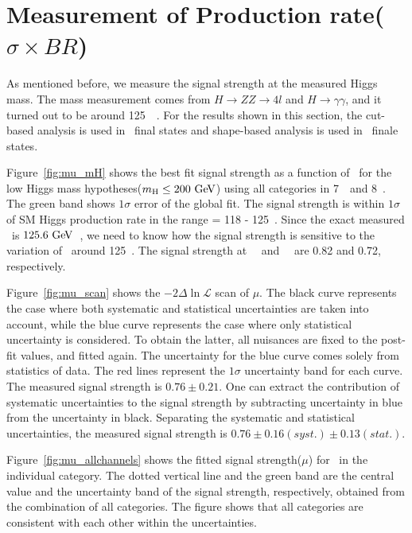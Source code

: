 \section{Measurement of Production rate($\sigma \times BR$)}

As mentioned before, we measure the signal strength at the 
measured Higgs mass. The mass measurement comes from 
$H\rightarrow ZZ\rightarrow4l$ and $H\rightarrow \gamma\gamma$, 
and it turned out to be around 125~\GeV~\cite{Chatrchyan:1637951, CMS-PAS-HIG-13-001}. 
For the results shown in this section,   
the cut-based analysis is used in \SF\ final states 
and shape-based analysis is used in \DF\ finale states. 

Figure~\ref{fig:mu_mH} shows the best fit signal strength 
as a function of \mHi\ for the low Higgs mass hypotheses($m_{\mathrm{H}}\le200~\mathrm{Ge\kern -0.1em V}$)
using all categories in 7~\TeV\ and 8~\TeV. 
The green band shows $1\sigma$ error of the global fit. 
The signal strength is within $1\sigma$ of SM Higgs production rate 
in the range \mHi = 118 - 125~\GeV. 
Since the exact measured \mHi\ is $125.6~\mathrm{Ge\kern -0.1em V}$~\cite{Chatrchyan:1637951}, 
we need to know how the signal strength is sensitive to the 
variation of \mHi\ around 125~\GeV. 
The signal strength at ~\GeV\ and ~\GeV\ are 0.82 and 0.72, respectively.

Figure~\ref{fig:mu_scan} shows the  $- 2\Delta\ln \mathcal{L}$ scan of $\mu$. 
The black curve represents the case where both systematic and statistical 
uncertainties are taken into account, while the blue curve represents the case 
where only statistical uncertainty is considered. To obtain the latter,  
all nuisances are fixed to the post-fit values, and fitted again.  
The uncertainty for the blue curve comes solely from statistics of data. 
The red lines represent the $1\sigma$ uncertainty band for each curve. 
The measured signal strength is $0.76 \pm 0.21$.  
One can extract the contribution of systematic uncertainties to the signal strength
by subtracting uncertainty in blue from the uncertainty in black.
Separating the systematic and statistical uncertainties, 
the measured signal strength is $0.76 \pm 0.16(syst.) \pm 0.13(stat.)$.  

Figure~\ref{fig:mu_allchannels} shows the fitted signal strength($\mu$) 
for ~\GeV in the individual category. 
The dotted vertical line and the green band are 
the central value and the uncertainty band of the signal strength, respectively, 
obtained from the combination of all categories. 
The figure shows that all categories are consistent with each other
within the uncertainties.

